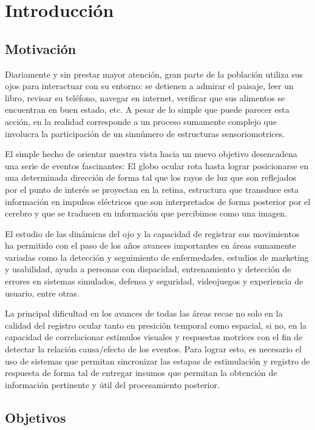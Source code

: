 \documentclass[../main.tex]{subfiles}
\begin{document}
		
\chapter{Introducción}
\label{cha:01_introducción}
	\section{Motivación}
	\label{sec:01_motivacion}

		Diariamente y sin prestar mayor atención, gran parte de la población utiliza sus ojos para interactuar con su entorno: se detienen a admirar el paisaje, leer un libro, revisar su teléfono, navegar en internet, verificar que sus alimentos se encuentran en buen estado, etc. A pesar de lo simple que puede parecer esta acción, en la realidad corresponde a un proceso sumamente complejo que involucra la participación de un sinnúmero de estructuras sensoriomotrices. 

		El simple hecho de orientar nuestra vista hacia un nuevo objetivo desencadena una serie de eventos fascinantes: El globo ocular rota hasta lograr posicionarse en una determinada dirección de forma tal que los rayos de luz que son reflejados por el punto de interés se proyectan en la \gls{retina}, estructura que transduce esta información en impulsos eléctricos que son interpretados de forma posterior por el cerebro y que se traducen en información que percibimos como una imagen.  

		El estudio de las dinámicas del ojo y la capacidad de registrar sus movimientos ha permitido con el paso de los años avances importantes en áreas sumamente variadas como la detección y seguimiento de enfermedades, estudios de marketing y usabilidad, ayuda a personas con dispacidad, entrenamiento y detección de errores en sistemas simulados, defensa y seguridad, videojuegos y experiencia de usuario, entre otras.

		La principal dificultad en los avances de todas las áreas recae no solo en la calidad del registro ocular tanto en presición temporal como espacial, si no, en la capacidad de correlacionar estímulos visuales y respuestas motrices con el fin de detectar la relación causa/efecto de los eventos. Para lograr esto, es necesario el uso de sistemas que permitan sincronizar las estapas de estimulación y registro de respuesta de forma tal de entregar insumos que permitan la obtención de información pertinente y útil del procesamiento posterior.  

	\section{Objetivos}
	\label{sec:01_objetivos}
\end{document}
